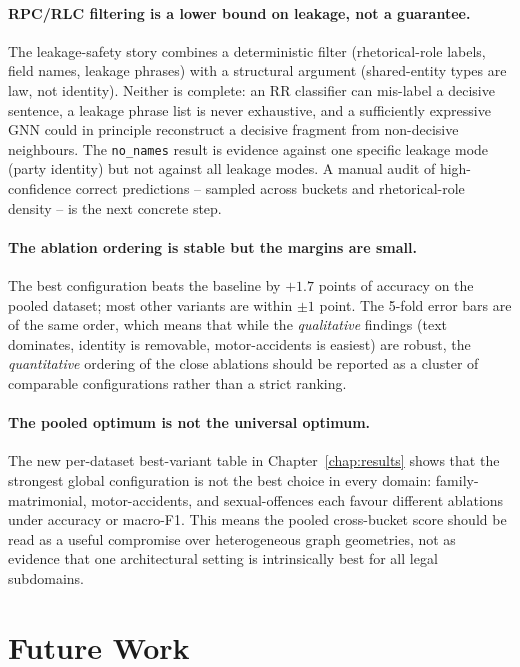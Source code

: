 \paragraph{RPC/RLC filtering is a lower bound on leakage, not a
guarantee.} The leakage-safety story combines a deterministic filter
(rhetorical-role labels, field names, leakage phrases) with a
structural argument (shared-entity types are law, not identity).
Neither is complete: an RR classifier can mis-label a decisive
sentence, a leakage phrase list is never exhaustive, and a sufficiently
expressive GNN could in principle reconstruct a decisive fragment
from non-decisive neighbours. The \texttt{no\_names} result is
evidence against one specific leakage mode (party identity) but not
against all leakage modes. A manual audit of high-confidence correct
predictions -- sampled across buckets and rhetorical-role density --
is the next concrete step.

\paragraph{The ablation ordering is stable but the margins are
small.} The best configuration beats the baseline by $+1.7$ points of
accuracy on the pooled dataset; most other variants are within
$\pm 1$ point. The 5-fold error bars are of the same order, which
means that while the \emph{qualitative} findings (text dominates,
identity is removable, motor-accidents is easiest) are robust, the
\emph{quantitative} ordering of the close ablations should be
reported as a cluster of comparable configurations rather than a
strict ranking.

{\color{blue}\paragraph{The pooled optimum is not the universal optimum.}
The new per-dataset best-variant table in Chapter~\ref{chap:results}
shows that the strongest global configuration is not the best choice in
every domain: family-matrimonial, motor-accidents, and
sexual-offences each favour different ablations under accuracy or
macro-F1. This means the pooled cross-bucket score should be read as a
useful compromise over heterogeneous graph geometries, not as evidence
that one architectural setting is intrinsically best for all legal
subdomains.}

\section{Future Work}

